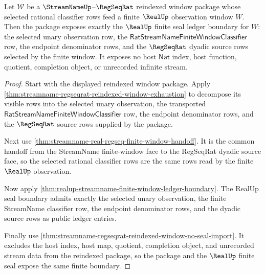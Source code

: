 \begin{theorem}
\label{thm:realup-streamname-regseqrat-reindexed-ledger-handoff}
Let $\mathcal{W}$ be a $\StreamNameUp$--$\RegSeqRat$ reindexed window package
whose selected rational classifier rows feed a finite $\RealUp$ observation
window $W$. Then the package exposes exactly the $\RealUp$ finite seal ledger
boundary for $W$: the selected unary observation row, the
$\mathsf{RatStreamNameFiniteWindowClassifier}$ row, the endpoint denominator
rows, and the $\RegSeqRat$ dyadic source rows selected by the finite window. It
exposes no host $\mathsf{Nat}$ index, host function, quotient, completion
object, or unrecorded infinite stream.
\end{theorem}
\begin{proof}
Start with the displayed reindexed window package. Apply
\autoref{thm:streamname-regseqrat-reindexed-window-exhaustion} to decompose its
visible rows into the selected unary observation, the transported
$\mathsf{RatStreamNameFiniteWindowClassifier}$ row, the endpoint denominator
rows, and the $\RegSeqRat$ source rows supplied by the package.

Next use \autoref{thm:streamname-real-regseq-finite-window-handoff}. It is the
common handoff from the StreamName finite-window face to the RegSeqRat dyadic
source face, so the selected rational classifier rows are the same rows read by
the finite $\RealUp$ observation.

Now apply \autoref{thm:realup-streamname-finite-window-ledger-boundary}. The
RealUp seal boundary admits exactly the selected unary observation, the finite
StreamName classifier row, the endpoint denominator rows, and the dyadic source
rows as public ledger entries.

Finally use \autoref{thm:streamname-regseqrat-reindexed-window-no-seal-import}.
It excludes the host index, host map, quotient, completion object, and
unrecorded stream data from the reindexed package, so the package and the
$\RealUp$ finite seal expose the same finite boundary.
\end{proof}

